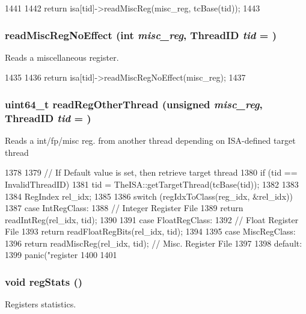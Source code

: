 \begin{DoxyCode}
1441 {
1442     return isa[tid]->readMiscReg(misc_reg, tcBase(tid));
1443 }
\end{DoxyCode}
\hypertarget{classInOrderCPU_af2ec8925148a53b9bddefb7fb65a7223}{
\subsubsection[{readMiscRegNoEffect}]{ readMiscRegNoEffect (int {\em misc\_\-reg}, \/  {\bf ThreadID} {\em tid} = {})}}
\label{classInOrderCPU_af2ec8925148a53b9bddefb7fb65a7223}
Reads a miscellaneous register. 


\begin{DoxyCode}
1435 {
1436     return isa[tid]->readMiscRegNoEffect(misc_reg);
1437 }
\end{DoxyCode}
\hypertarget{classInOrderCPU_ab5092ae128090a3cac51e6f84c458e62}{
\subsubsection[{readRegOtherThread}]{\setlength{\rightskip}{0pt plus 5cm}uint64\_\-t readRegOtherThread (unsigned {\em misc\_\-reg}, \/  {\bf ThreadID} {\em tid} = {})}}
\label{classInOrderCPU_ab5092ae128090a3cac51e6f84c458e62}
Reads a int/fp/misc reg. from another thread depending on ISA-\/defined target thread 


\begin{DoxyCode}
1378 {
1379     // If Default value is set, then retrieve target thread
1380     if (tid == InvalidThreadID) {
1381         tid = TheISA::getTargetThread(tcBase(tid));
1382     }
1383 
1384     RegIndex rel_idx;
1385 
1386     switch (regIdxToClass(reg_idx, &rel_idx)) {
1387       case IntRegClass:
1388         // Integer Register File
1389         return readIntReg(rel_idx, tid);
1390 
1391       case FloatRegClass:
1392         // Float Register File
1393         return readFloatRegBits(rel_idx, tid);
1394 
1395       case MiscRegClass:
1396         return readMiscReg(rel_idx, tid);  // Misc. Register File
1397 
1398       default:
1399         panic("register %
1400     }
1401 }
\end{DoxyCode}
\hypertarget{classInOrderCPU_a4dc637449366fcdfc4e764cdf12d9b11}{
\subsubsection[{regStats}]{\setlength{\rightskip}{0pt plus 5cm}void regStats ()}}
\label{classInOrderCPU_a4dc637449366fcdfc4e764cdf12d9b11}
Registers statistics. 


